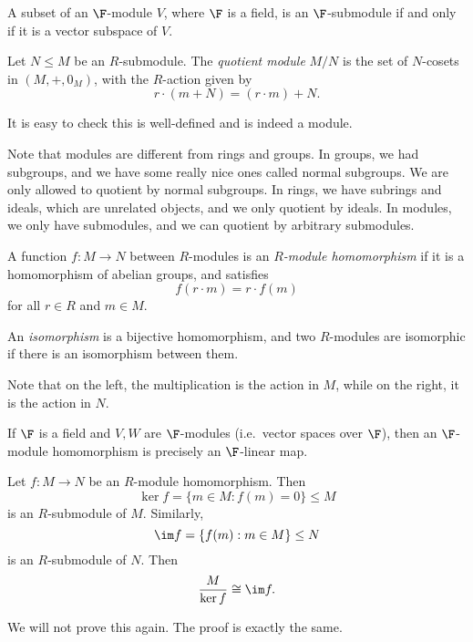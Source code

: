 \documentclass[a4paper]{article}
\begin{document}
\begin{eg}
  A subset of an $\F$-module $V$, where $\F$ is a field, is an $\F$-submodule if and only if it is a vector subspace of $V$.
\end{eg}

\begin{defi}
  Let $N \leq M$ be an $R$-submodule. The \emph{quotient module} $M/N$ is the set of $N$-cosets in $(M, +, 0_M)$, with the $R$-action given by
  \[
    r\cdot (m + N) = (r\cdot m) + N.
  \]
\end{defi}
It is easy to check this is well-defined and is indeed a module.

Note that modules are different from rings and groups. In groups, we had subgroups, and we have some really nice ones called normal subgroups. We are only allowed to quotient by normal subgroups. In rings, we have subrings and ideals, which are unrelated objects, and we only quotient by ideals. In modules, we only have submodules, and we can quotient by arbitrary submodules.

\begin{defi}
  A function $f: M \to N$ between $R$-modules is an \emph{$R$-module homomorphism} if it is a homomorphism of abelian groups, and satisfies
  \[
    f(r \cdot m) = r \cdot f(m)
  \]
  for all $r \in R$ and $m \in M$.

  An \emph{isomorphism} is a bijective homomorphism, and two $R$-modules are isomorphic if there is an isomorphism between them.
\end{defi}
Note that on the left, the multiplication is the action in $M$, while on the right, it is the action in $N$.

\begin{eg}
  If $\F$ is a field and $V, W$ are $\F$-modules (i.e.\ vector spaces over $\F$), then an $\F$-module homomorphism is precisely an $\F$-linear map.
\end{eg}

\begin{thm}
  Let $f: M \to N$ be an $R$-module homomorphism. Then
  \[
    \ker f = \{m \in M: f(m) = 0\} \leq M
  \]
  is an $R$-submodule of $M$. Similarly,
  \[
    \im f = \{f(m): m \in M\}\leq N
  \]
  is an $R$-submodule of $N$. Then
  \[
    \frac{M}{\ker f} \cong \im f.
  \]
\end{thm}

We will not prove this again. The proof is exactly the same.
\end{document}
